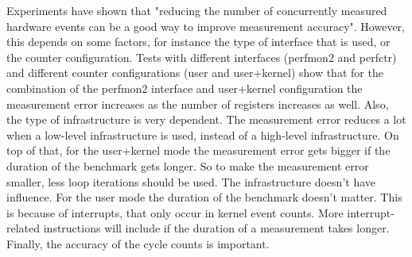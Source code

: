 Experiments have shown that "reducing the number of concurrently measured hardware events can be a good way to improve measurement accuracy". However, this depends on some factors, for instance the type of interface that is used, or the counter configuration.
Tests with different interfaces (perfmon2 and perfctr) and different counter configurations (user and user+kernel) show that for the combination of the perfmon2 interface and user+kernel configuration the measurement error increases as the number of registers increases as well.
Also, the type of infrastructure is very dependent. The measurement error reduces a lot when a low-level infrastructure is used, instead of a high-level infrastructure.
On top of that, for the user+kernel mode the measurement error gets bigger if the duration of the benchmark gets longer. So to make the measurement error smaller, less loop iterations should be used.  The infrastructure doesn't have influence. For the user mode the duration of the benchmark doesn't matter. This is because of interrupts, that only occur in kernel event counts. More interrupt-related instructions will include if the duration of a measurement takes longer.
Finally, the accuracy of the cycle counts is important. \cite{USITRsection4.1}
